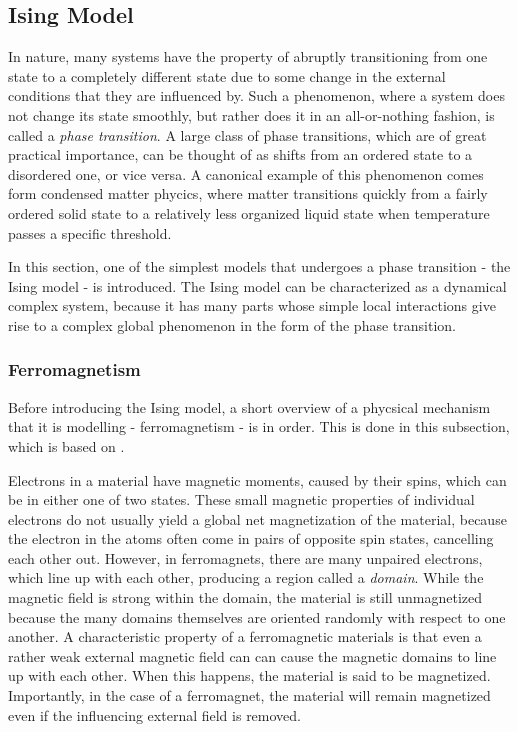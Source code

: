 \documentclass[12pt]{article}
\begin{document}
\newpage
\subsection{Ising Model}

In nature, many systems have the property of abruptly transitioning from one state to a completely different state due to some change in the external conditions that they are influenced by. Such a phenomenon, where a system does not change its state smoothly, but rather does it in an all-or-nothing fashion, is called a \textit{phase transition}. A large class of phase transitions, which are of great practical importance, can be thought of as shifts from an ordered state to a disordered one, or vice versa. A canonical example of this phenomenon comes form condensed matter phycics, where matter transitions quickly from a fairly ordered solid state to a relatively less organized liquid state when temperature passes a specific threshold.\cite{inf-flow-ising-commentary}

In this section, one of the simplest models that undergoes a phase transition - the Ising model - is introduced. The Ising model can be characterized as a dynamical complex system, because it has many parts whose simple local interactions give rise to a complex global phenomenon in the form of the phase transition. 

\subsubsection{Ferromagnetism}

Before introducing the Ising model, a short overview of a phycsical mechanism that it is modelling - ferromagnetism - is in order. This is done in this subsection, which is based on \cite{memory-systems-cache-ram}.

Electrons in a material have magnetic moments, caused by their spins, which can be in either one of two states. These small magnetic properties of individual electrons do not usually yield a global net magnetization of the material, because the electron in the atoms often come in pairs of opposite spin states, cancelling each other out. However, in ferromagnets, there are many unpaired electrons, which line up with each other, producing a region called a \textit{domain}. While the magnetic field is strong within the domain, the material is still unmagnetized because the many domains themselves are oriented randomly with respect to one another. A characteristic property of a ferromagnetic materials is that even a rather weak external magnetic field can can cause the magnetic domains to line up with each other. When this happens, the material is said to be magnetized. Importantly, in the case of a ferromagnet, the material will remain magnetized even if the influencing external field is removed. 
\end{document}
